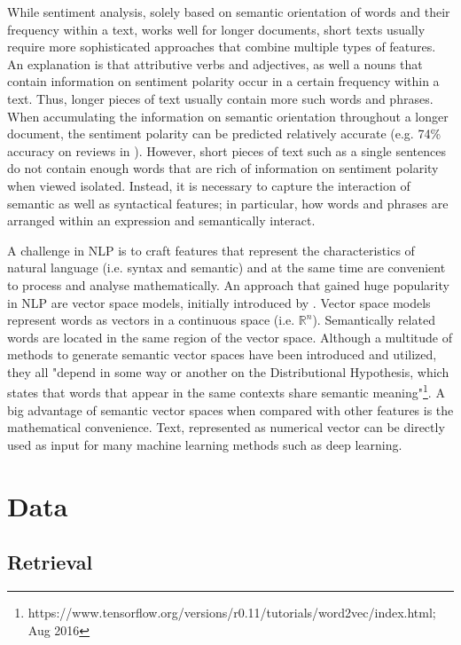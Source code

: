 \documentclass[a4paper,12pt]{article}%
\begin{document}
While sentiment analysis, solely based on semantic orientation of words and their frequency within a text, works well for longer documents, short texts usually require more sophisticated approaches that combine multiple types of features. An explanation is that attributive verbs and adjectives, as well a nouns that contain information on sentiment polarity occur in a certain frequency within a text. Thus, longer pieces of text usually contain more such words and phrases. When accumulating the information on semantic orientation throughout a longer document, the sentiment polarity can be predicted relatively accurate (e.g. 74\% accuracy on reviews in \citet{Turney2002}). However, short pieces of text such as a single sentences do not contain enough words that are rich of information on sentiment polarity when viewed isolated. Instead, it is necessary to capture the interaction of semantic as well as syntactical features; in particular, how words and phrases are arranged within an expression and semantically interact.

A challenge in NLP is to craft features that represent the characteristics of natural language (i.e. syntax and semantic) and at the same time are convenient to process and analyse mathematically. An approach that gained huge popularity in NLP are vector space models, initially introduced by \citet{Salton1975}. Vector space models represent words as vectors in a continuous space (i.e. $\mathbb{R}^n$). Semantically related words are located in the same region of the vector space. Although a multitude of methods to generate semantic vector spaces have been introduced and utilized, they all "depend in some way or another on the Distributional Hypothesis, which states that words that appear in the same contexts share semantic meaning"\footnote{https://www.tensorflow.org/versions/r0.11/tutorials/word2vec/index.html; Aug 2016}. A big advantage of semantic vector spaces when compared with other features is the mathematical convenience. Text, represented as numerical vector can be directly used as input for many machine learning methods such as deep learning. 


\section{Data \label{data}}
\subsection{Retrieval}
\end{document}
